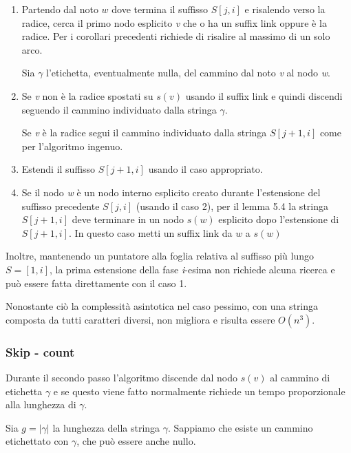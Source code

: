 \begin{enumerate}
	\item Partendo dal noto $ w $ dove termina il suffisso $ S[j,i] $ e risalendo verso la radice, cerca il primo nodo esplicito \textit{v} che o ha un suffix link oppure è la radice. Per i corollari precedenti richiede di risalire al massimo di un solo arco.
	
	Sia $\gamma$ l'etichetta, eventualmente nulla, del cammino dal noto \textit{v} al nodo \textit{w}.
	
	\item Se \textit{v} non è la radice spostati su  $s(v)$ usando il suffix link e quindi discendi seguendo il cammino individuato dalla stringa $ \gamma $.
	
	Se \textit{v} è la radice segui il cammino individuato dalla stringa $ S[j+1,i] $ come per l'algoritmo ingenuo.
	
	\item Estendi il suffisso $ S[j+1,i] $ usando il caso appropriato.
	
	\item Se il nodo \textit{w} è un nodo interno esplicito creato durante l'estensione del suffisso precedente $S[j,i]$ (usando il caso 2), per il lemma 5.4 la stringa $ S[j+1,i] $ deve terminare in un nodo $ s(w) $ esplicito dopo l'estensione di $ S[j+1,i] $. In questo caso metti un suffix link da $ w $ a $ s(w) $
\end{enumerate}

Inoltre, mantenendo un puntatore alla foglia relativa al suffisso più lungo $ S=[1,i] $, la prima estensione della fase \textit{i}-esima non richiede alcuna ricerca e può essere fatta direttamente con il caso 1.

Nonostante ciò la complessità asintotica nel caso pessimo, con una stringa composta da tutti caratteri diversi, non migliora e risulta essere $ O(n^3) $.

\subsubsection{Skip - count}

Durante il secondo passo l'algoritmo discende dal nodo $s(v)$ al cammino di etichetta $\gamma$ e se questo viene fatto normalmente richiede un tempo proporzionale alla lunghezza di $\gamma$.

Sia $g = |\gamma|$ la lunghezza della stringa $\gamma$. Sappiamo che esiste un cammino etichettato con $\gamma$, che può essere anche nullo.

